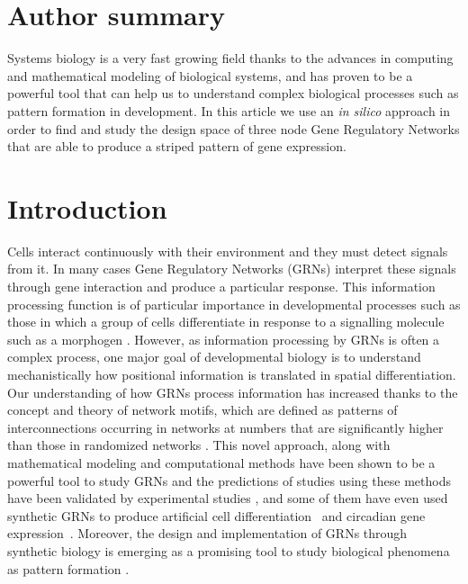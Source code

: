 \documentclass[10pt,letterpaper]{article}
\begin{document}
\section*{Author summary}
Systems biology is a very fast growing field thanks to the advances in computing and
mathematical modeling of biological systems, and has proven to be a powerful tool that
can help us to understand complex biological processes such as pattern formation in
development. In this article we use an \textit{in silico} approach in order to find and study
the design space of three node Gene Regulatory Networks that are able to produce a 
striped pattern of gene expression.

\linenumbers

\section*{Introduction}

Cells interact continuously with their environment and they must detect signals
from it. In many cases Gene Regulatory Networks (GRNs) interpret these signals
through gene interaction and produce a particular response. This information
processing function is of particular importance in developmental processes such
as those in which a group of cells differentiate in response to a signalling
molecule such as a morphogen \cite{Turing1952, Wolpert1969}. However, as
information processing by GRNs is often a complex process, one major goal of
developmental biology is to understand mechanistically how positional
information is translated in spatial differentiation.\\

Our understanding of how GRNs process information has increased thanks to the
concept and theory of network motifs, which are defined as patterns of
interconnections occurring in networks at numbers that are significantly higher
than those in randomized networks \cite{Milo2002}. This novel approach, along
with mathematical modeling and computational methods have been shown to be a
powerful tool to study GRNs and the predictions of studies using these methods
have been validated by experimental studies
\cite{Kalir2005,Kalir2004,Mangan2003a,ODonnell2005}, and some of them 
have even used synthetic GRNs to produce artificial cell differentiation~\cite{Basu2005} 
and circadian gene expression~\cite{atkinson_development_2003}. Moreover, 
the design and implementation of GRNs through synthetic biology is emerging as 
a promising tool to study biological phenomena as pattern formation 
\cite{santos-moreno_using_2019}.
\end{document}
